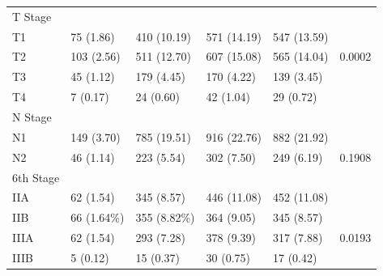 \documentclass[times,sort&compress,3p]{elsarticle}
\theoremstyle{plain}
\theoremstyle{definition}
\begin{document}
\begin{table}[H]
\centering
\begin{tabular}{llllll} 

T   Stage        &                                                              &              &              &              &                    \\
T1               & 75 (1.86)                                                    & 410 (10.19)  & 571 (14.19)  & 547 (13.59)  &                    \\
T2               & 103 (2.56)                                                   & 511 (12.70)  & 607 (15.08)  & 565 (14.04)  & 0.0002             \\
T3               & 45 (1.12)                                                    & 179 (4.45)   & 170 (4.22)   & 139 (3.45)   &                    \\
T4               & 7 (0.17)                                                     & 24 (0.60)    & 42 (1.04)    & 29 (0.72)    &                    \\ \hline
N Stage          &                                                              &              &              &              &                    \\
N1               & 149 (3.70)                                                   & 785 (19.51)  & 916 (22.76)  & 882 (21.92)  &                    \\
N2               & 46 (1.14)                                                    & 223 (5.54)   & 302 (7.50)   & 249 (6.19)   & 0.1908             \\ \hline
6th Stage        &                                                              &              &              &              &                    \\
IIA              & 62 (1.54)                                                    & 345 (8.57)   & 446 (11.08)  & 452 (11.08)  &                    \\
IIB              & 66 (1.64\%)                                                  & 355 (8.82\%) & 364 (9.05)   & 345 (8.57)   &                    \\
IIIA             & 62 (1.54)                                                    & 293 (7.28)   & 378 (9.39)   & 317 (7.88)   & 0.0193             \\
IIIB             & 5 (0.12)                                                     & 15 (0.37)    & 30 (0.75)    & 17 (0.42)    &                    \\

\end{tabular}
\end{table}
\end{document}

